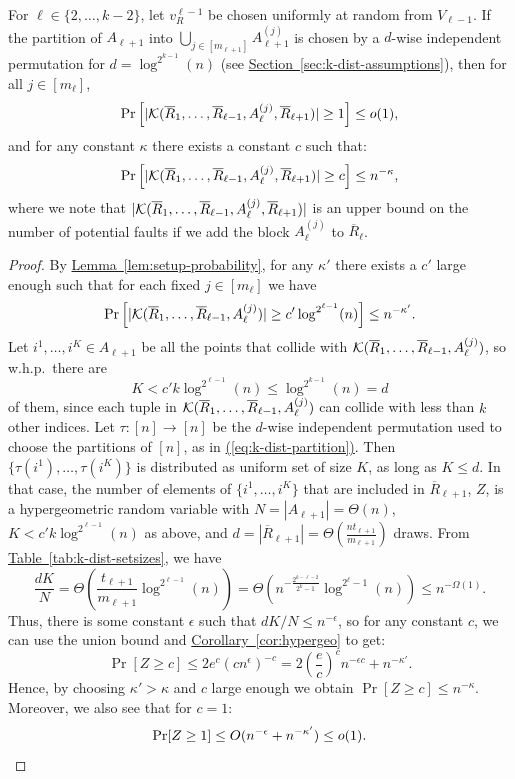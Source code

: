 \documentclass{theoretics}
\newcommand{\eq}[1]{\hyperref[eq:#1]{(\ref*{eq:#1})}}
\renewcommand{\sec}[1]{\hyperref[sec:#1]{Section~\ref*{sec:#1}}}
\newcommand{\lem}[1]{\hyperref[lem:#1]{Lemma~\ref*{lem:#1}}}
\newcommand{\cor}[1]{\hyperref[cor:#1]{Corollary~\ref*{cor:#1}}}
\newcommand{\tabl}[1]{\hyperref[tab:#1]{Table~\ref*{tab:#1}}}
\renewcommand{\>}{\rangle}
\newcommand{\<}{\langle}
\renewcommand{\(}{\left(}
\renewcommand{\)}{\right)}
\begin{document}
\begin{corollary}\label{cor:fault-prob}
For $\ell\in\{2,\dots,k-2\}$, let $v_R^{\ell-1}$ be chosen uniformly at random from $V_{\ell-1}$. If the partition of $A_{\ell+1}$ into $\bigcup_{j\in [m_{\ell+1}]}A_{\ell+1}^{(j)}$ is chosen by a $d$-wise independent permutation for $d=\log^{2^{k-1}}(n)$ (see \sec{k-dist-assumptions}), then for all $j\in [m_{\ell}]$,
	$$\Pr\left[ |{\cal K}(\overline{R}_1,\dots,\overline{R}_{\ell-1},A_{\ell}^{(j)},\overline{R}_{\ell+1})|\geq 1\right] \leq o(1),$$
and for any constant $\kappa$ there exists a constant $c$ such that:
	$$\Pr\left[ |{\cal K}(\overline{R}_1,\dots,\overline{R}_{\ell-1},A_{\ell}^{(j)},\overline{R}_{\ell+1})|\geq c\right] \leq n^{-\kappa},$$
	where we note that $|{\cal K}(\overline{R}_1,\dots,\overline{R}_{\ell-1},A_{\ell}^{(j)},\overline{R}_{\ell+1})|$ is an upper bound on the number of potential faults if we add the block $A_{\ell}^{(j)}$ to $\overline{R}_{\ell}$. 
\end{corollary}
\begin{proof}
	By \lem{setup-probability}, for any $\kappa'$ there exists a $c'$ large enough such that for each fixed $j \in [m_{\ell}]$ we have
	$$\Pr\left[ |{\cal K}(\overline{R}_1,\dots,\overline{R}_{\ell-1},A_{\ell}^{(j)})|\geq c'\log^{2^{\ell-1}}(n)\right]\leq {n^{-\kappa'}}.$$
Let $i^{1},\dots,i^K\in A_{\ell+1}$ be all the points that collide with ${\cal K}(\overline{R}_1,\dots,\overline{R}_{\ell-1},A_{\ell}^{(j)})$, so w.h.p.~there are 
$$K < c'k\log^{2^{\ell-1}}(n) \leq \log^{2^{k-1}}(n)=d$$ 
of them, since each tuple in ${\cal K}(\overline{R}_1,\dots,\overline{R}_{\ell-1},A_{\ell}^{(j)})$ can collide with less than $k$ other indices. Let $\tau:[n]\rightarrow[n]$ be the $d$-wise independent permutation used to choose the partitions of $[n]$, as in \eq{k-dist-partition}. Then $\{\tau(i^1),\dots,\tau(i^K)\}$ is distributed as uniform set of size $K$, as long as $K\leq d$. In that case, the number of elements of $\{i^1,\dots,i^K\}$ that are included in $\overline{R}_{\ell+1}$, $Z$, is a hypergeometric random variable with $N=|A_{\ell+1}|=\Theta(n)$, $K< c'k\log^{2^{\ell-1}}(n)$ as above, and $d=|\overline{R}_{\ell+1}|=\Theta\left(\frac{nt_{\ell+1}}{m_{\ell+1}}\right)$ draws. 
From \tabl{k-dist-setsizes}, we have
	$$\frac{dK}{N}=\Theta\left(\frac{t_{\ell+1}}{m_{\ell+1}}\log^{2^{\ell-1}}(n)\right) = \Theta\left(n^{-\frac{2^{k-\ell-2}}{2^k-1}}\log^{2^{\ell}-1}(n)\right)\leq n^{-\Omega(1)}.$$
Thus, there is some constant $\epsilon$ such that $dK/N\leq n^{-\epsilon}$, so for any constant $c$, we can use the union bound and \cor{hypergeo} to get:
$$\Pr[Z\geq c]\leq 2e^c\left(cn^{\epsilon}\right)^{-c}=2\left(\frac{e}{c}\right)^c n^{-\epsilon c}+n^{-\kappa'}.$$
Hence, by choosing $\kappa' > \kappa$ and $c$ large enough we obtain $\Pr[Z\geq c] \leq n^{-\kappa}.$
Moreover, we also see that for $c=1$:
\begin{equation*}
\Pr[Z\geq 1]\leq O(n^{-\epsilon}+ n^{-\kappa'}) \leq o(1).\qedhere
\end{equation*}
\end{proof}
\end{document}
